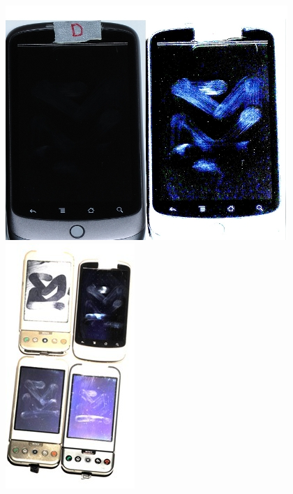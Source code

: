 \begin{anexos}
\begin{figure}[H]
	\begin{minipage}{0.5\linewidth}  %
		\centering
		\includegraphics[width=\linewidth]{13.jpg} %
	\end{minipage}%
	\hfill
	\begin{minipage}{0.5\linewidth}  %
		\centering
		\includegraphics[width=0.5\linewidth]{9.jpg} %
	\end{minipage} %


\end{figure}
\end{anexos}
